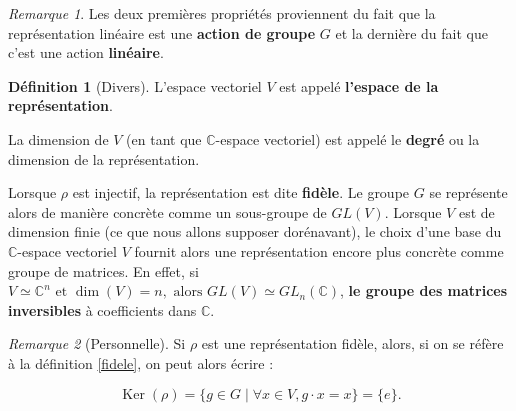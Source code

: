 \documentclass[french]{article}
\theoremstyle{theorem}
\theoremstyle{definition}
\newtheorem{protodefinition}{Définition}[section]
\newenvironment{definition}
    {\colorlet{shadecolor}{green!5}\begin{shaded}\begin{protodefinition}}
    {\end{protodefinition}\end{shaded}}
\theoremstyle{remark}
\newtheorem*{remark}{Remarque}
\newcommand{\C}{\mathbb{C}}
\begin{document}
\begin{remark}
  Les deux premières propriétés proviennent du fait que la représentation linéaire est une \textbf{action de groupe} \(G\) et la dernière du fait que c'est une action \textbf{linéaire}.
\end{remark}


\begin{definition}[Divers]
  L'espace vectoriel \(V\) est appelé \textbf{l'espace de la représentation}.

  La dimension de \(V\) (en tant que \(\C\)-espace vectoriel) est appelé le \textbf{degré} ou la dimension de la représentation.

  Lorsque \(\rho\) est injectif, la représentation est dite \textbf{fidèle}. Le groupe \(G\) se représente alors de manière concrète comme un sous-groupe de \(GL(V)\). Lorsque \(V\) est de dimension finie (ce que nous allons supposer dorénavant), le choix d'une base du \(\C\)-espace vectoriel \(V\) fournit alors une représentation encore plus concrète comme groupe de matrices. En effet, si \(V \simeq \C^{n} \text{ et } \operatorname{dim}(V) = n, \text{ alors } GL(V) \simeq GL_n(\C)\), \textbf{le groupe des matrices inversibles} à coefficients dans \(\C\).
\end{definition}

\begin{remark}[Personnelle]
  Si \(\rho\) est une représentation fidèle, alors, si on se réfère à la définition \ref{fidele}, on peut alors écrire :

  \[\operatorname{Ker}(\rho) = \{ g \in G \mid \forall x \in V, g \cdot x = x \} = \{ e \}. \]
\end{remark}
\end{document}
